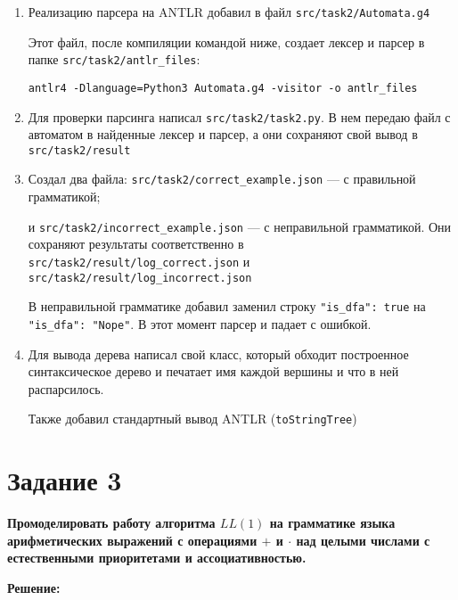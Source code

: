 \documentclass{article}
\begin{document}
\begin{enumerate}
	\item Реализацию парсера на ANTLR добавил в файл \texttt{src/task2/Automata.g4}
	
	Этот файл, после компиляции командой ниже, создает лексер и парсер в папке  \texttt{src/task2/antlr\_files}:
	
	\texttt{antlr4 -Dlanguage=Python3 Automata.g4 -visitor -o antlr\_files}
	
	
	\item Для проверки парсинга написал \texttt{src/task2/task2.py}. В нем передаю файл с автоматом в найденные лексер и парсер, а они сохраняют свой вывод в \texttt{src/task2/result}
	

	\item Создал два файла: \texttt{src/task2/correct\_example.json} ---  с правильной грамматикой;
	
	и \texttt{src/task2/incorrect\_example.json} --- с неправильной грамматикой. Они сохраняют результаты соответственно в \texttt{src/task2/result/log\_correct.json} и \texttt{src/task2/result/log\_incorrect.json}
	
	В неправильной грамматике добавил заменил строку \texttt{"is\_dfa": true} на \texttt{"is\_dfa": "Nope"}. В этот момент парсер и падает с ошибкой.
	
	\item Для вывода дерева написал свой класс, который обходит построенное синтаксическое дерево и печатает имя каждой вершины и что в ней распарсилось.
	
	Также добавил стандартный вывод ANTLR (\texttt{toStringTree})
	
	
\end{enumerate}


	\section*{Задание 3}

{\bfseries Промоделировать работу алгоритма $LL(1)$ на грамматике языка арифметических выражений с операциями $+$ и $\cdot$ над целыми числами с естественными приоритетами и ассоциативностью.}

\begin{center}
	\textbf{Решение:}
\end{center}
\end{document}
